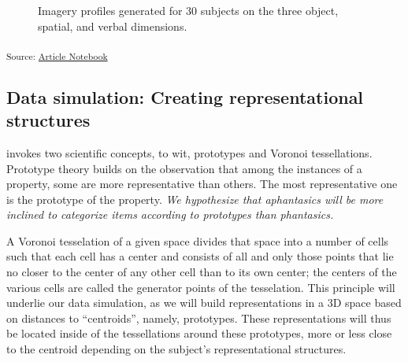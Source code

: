 \documentclass[
  authoryear]{elsarticle}
\begin{document}
\label{cell-fig-plot-osv-model}
\begin{figure}[H]


\caption{\label{fig-plot-osv-model}Imagery profiles generated for 30
subjects on the three object, spatial, and verbal dimensions.}

\end{figure}%

\textsubscript{Source:
\href{https://m-delem.github.io/2499-similarity-manuscript/index.qmd.html}{Article
Notebook}}

\subsection{Data simulation: Creating representational
structures}\label{data-simulation-creating-representational-structures}

\citet{gardenfors2004} invokes two scientific concepts, to wit,
prototypes and Voronoi tessellations. Prototype theory builds on the
observation that among the instances of a property, some are more
representative than others. The most representative one is the prototype
of the property. \emph{We hypothesize that aphantasics will be more
inclined to categorize items according to prototypes than phantasics.}

A Voronoi tesselation of a given space divides that space into a number
of cells such that each cell has a center and consists of all and only
those points that lie no closer to the center of any other cell than to
its own center; the centers of the various cells are called the
generator points of the tesselation. This principle will underlie our
data simulation, as we will build representations in a 3D space based on
distances to ``centroids'', namely, prototypes. These representations
will thus be located inside of the tessellations around these
prototypes, more or less close to the centroid depending on the
subject's representational structures.
\end{document}
